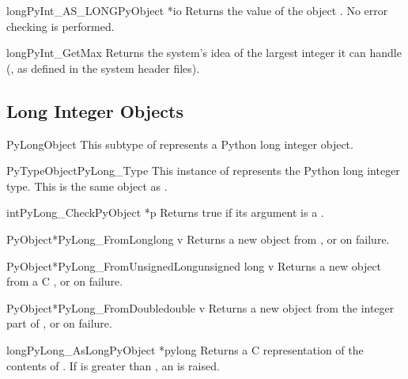 \documentclass{manual}
\begin{document}
\begin{cfuncdesc}{long}{PyInt_AS_LONG}{PyObject *io}
Returns the value of the object .  No error checking is
performed.
\end{cfuncdesc}

\begin{cfuncdesc}{long}{PyInt_GetMax}{}
Returns the system's idea of the largest integer it can handle
(, as defined in the system
header files).
\end{cfuncdesc}


\subsection{Long Integer Objects \label{longObjects}}

\begin{ctypedesc}{PyLongObject}
This subtype of  represents a Python long integer
object.
\end{ctypedesc}

\begin{cvardesc}{PyTypeObject}{PyLong_Type}
This instance of  represents the Python long
integer type.  This is the same object as .
\end{cvardesc}

\begin{cfuncdesc}{int}{PyLong_Check}{PyObject *p}
Returns true if its argument is a .
\end{cfuncdesc}

\begin{cfuncdesc}{PyObject*}{PyLong_FromLong}{long v}
Returns a new  object from , or \NULL{} on
failure.
\end{cfuncdesc}

\begin{cfuncdesc}{PyObject*}{PyLong_FromUnsignedLong}{unsigned long v}
Returns a new  object from a C , or \NULL{} on failure.
\end{cfuncdesc}

\begin{cfuncdesc}{PyObject*}{PyLong_FromDouble}{double v}
Returns a new  object from the integer part of
, or \NULL{} on failure.
\end{cfuncdesc}

\begin{cfuncdesc}{long}{PyLong_AsLong}{PyObject *pylong}
Returns a C  representation of the contents of
.  If  is greater than
, an  is
raised.
\end{cfuncdesc}
\end{document}
